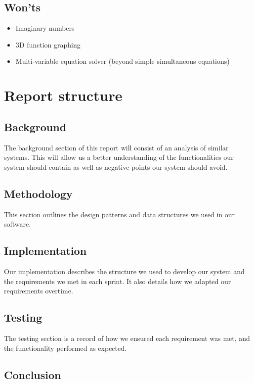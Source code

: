 \documentclass[a4paper, oneside, 11pt]{report}
\begin{document}
\subsection{Won'ts}
\begin{itemize}
	\item Imaginary numbers
	\item 3D function graphing
	\item Multi-variable equation solver (beyond simple simultaneous equations)
\end{itemize}

\section{Report structure}

\subsection {Background}

The background section of this report will consist of an analysis of similar systems. This will allow us a better understanding of the functionalities our system should contain as well as negative points our system should avoid.

\subsection {Methodology}

This section outlines the design patterns and data structures we used in our software.

\subsection {Implementation}

Our implementation describes the structure we used to develop our system and the requirements we met in each sprint. It also details how we adapted our requirements overtime.

\subsection {Testing}

The testing section is a record of how we ensured each requirement was met, and the functionality performed as expected.

\subsection {Conclusion}
\end{document}
